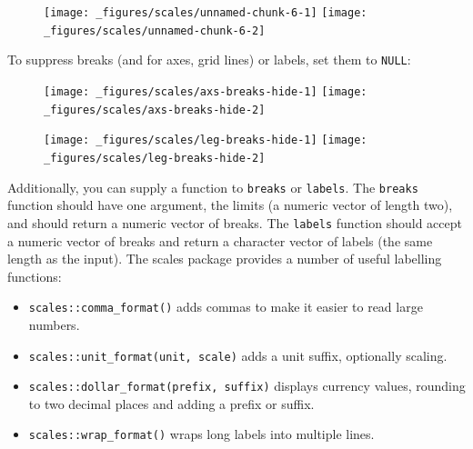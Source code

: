 \begin{figure}[H]
  \texttt{[image: \_figures/scales/unnamed-chunk-6-1]}%
  \texttt{[image: \_figures/scales/unnamed-chunk-6-2]}
\end{figure}

To suppress breaks (and for axes, grid lines) or labels, set them to
\texttt{NULL}:

\begin{Shaded}
\begin{Highlighting}[]
\StringTok{ }\NormalTok{(} \NormalTok{)}
\StringTok{ }\NormalTok{(} \NormalTok{)}
\end{Highlighting}
\end{Shaded}

\begin{figure}[H]
  \texttt{[image: \_figures/scales/axs-breaks-hide-1]}%
  \texttt{[image: \_figures/scales/axs-breaks-hide-2]}
\end{figure}

\begin{Shaded}
\begin{Highlighting}[]
\StringTok{ }\NormalTok{(} \NormalTok{)}
\StringTok{ }\NormalTok{(} \NormalTok{)}
\end{Highlighting}
\end{Shaded}

\begin{figure}[H]
  \texttt{[image: \_figures/scales/leg-breaks-hide-1]}%
  \texttt{[image: \_figures/scales/leg-breaks-hide-2]}
\end{figure}

Additionally, you can supply a function to \texttt{breaks} or
\texttt{labels}. The \texttt{breaks} function should have one argument,
the limits (a numeric vector of length two), and should return a numeric
vector of breaks. The \texttt{labels} function should accept a numeric
vector of breaks and return a character vector of labels (the same
length as the input). The scales package provides a number of useful
labelling functions:

\begin{itemize}
\item
  \texttt{scales::comma\_format()} adds commas to make it easier to read
  large numbers.
\item
  \texttt{scales::unit\_format(unit,\ scale)} adds a unit suffix,
  optionally scaling.
\item
  \texttt{scales::dollar\_format(prefix,\ suffix)} displays currency
  values, rounding to two decimal places and adding a prefix or suffix.
\item
  \texttt{scales::wrap\_format()} wraps long labels into multiple lines.
\end{itemize}

